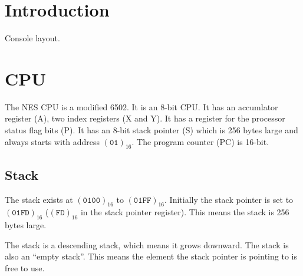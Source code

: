 \documentclass[10pt, draft]{book}
\begin{document}
  \begin{titlepage}
  \end{titlepage}

  \tableofcontents

  \chapter{Introduction}

  Console layout.

  \chapter{CPU}

  The NES CPU is a modified 6502. It is an 8-bit CPU. It has an accumlator
  register (A), two index registers (X and Y). It has a register for the
  processor status flag bits (P). It has an 8-bit stack pointer (S) which is
  256 bytes large and always starts with address $(\texttt{01})_{16}$. The
  program counter (PC) is 16-bit.

  \section{Stack}

  The stack exists at $(\texttt{0100})_{16}$ to $(\texttt{01FF})_{16}$.
  Initially the stack pointer is set to $(\texttt{01FD})_{16}$
  ($(\texttt{FD})_{16}$ in the stack pointer register). This means the stack is
  256 bytes large.

  The stack is a descending stack, which means it grows downward. The stack is
  also an ``empty stack''. This means the element the stack pointer is pointing
  to is free to use.

\end{document}
